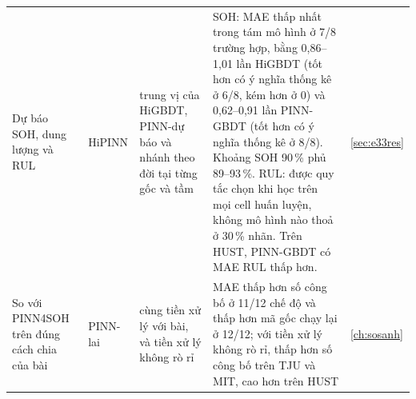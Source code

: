 \begin{table}[!htbp]
\begin{tabularx}{\textwidth}{>{\raggedright\arraybackslash}p{2.0cm}>{\raggedright\arraybackslash}p{1.6cm}>{\raggedright\arraybackslash}p{3.3cm}>{\raggedright\arraybackslash}Xl}
Dự báo SOH, dung lượng và RUL & HiPINN & trung vị của HiGBDT, PINN-dự báo và nhánh theo đời tại từng gốc và tầm & SOH: MAE thấp nhất trong tám mô hình ở 7/8 trường hợp, bằng 0{,}86--1{,}01 lần HiGBDT (tốt hơn có ý nghĩa thống kê ở 6/8, kém hơn ở 0) và 0{,}62--0{,}91 lần PINN-GBDT (tốt hơn có ý nghĩa thống kê ở 8/8). Khoảng SOH 90\,\% phủ 89--93\,\%. RUL: được quy tắc chọn khi học trên mọi cell huấn luyện, không mô hình nào thoả ở 30\,\% nhãn. Trên HUST, PINN-GBDT có MAE RUL thấp hơn. & \ref{sec:e33res} \\\addlinespace
So với PINN4SOH trên đúng cách chia của bài & PINN-lai & cùng tiền xử lý với bài, và tiền xử lý không rò rỉ & MAE thấp hơn số công bố ở 11/12 chế độ và thấp hơn mã gốc chạy lại ở 12/12; với tiền xử lý không rò rỉ, thấp hơn số công bố trên TJU và MIT, cao hơn trên HUST & \ref{ch:sosanh} \\
\bottomrule\end{tabularx}\end{table}
